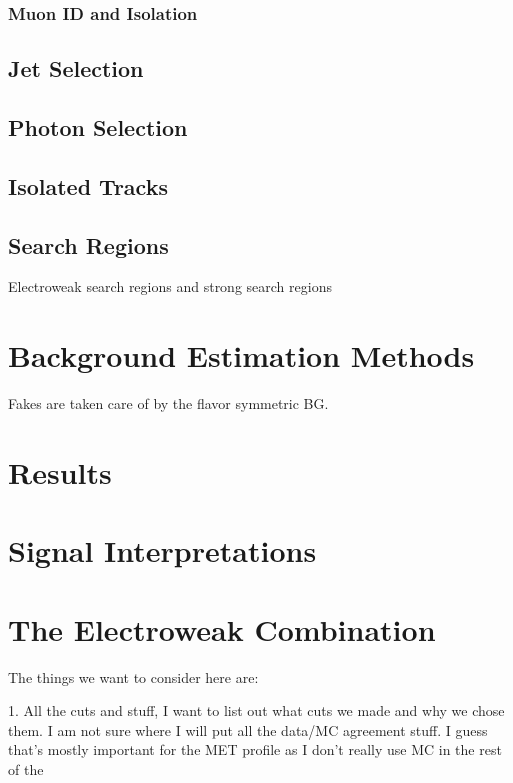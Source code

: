     \subsubsection{Muon ID and Isolation}

  \subsection{Jet Selection}

  \subsection{Photon Selection}

  \subsection{Isolated Tracks}

  \subsection{Search Regions}
    Electroweak search regions and strong search regions

\section{Background Estimation Methods}
Fakes are taken care of by the flavor symmetric BG.

\section{Results}

\section{Signal Interpretations} 

\section{The Electroweak Combination}

The things we want to consider here are: 

  1. All the cuts and stuff, I want to list out what cuts we made and why we chose them. I am not sure where I will put all the data/MC agreement stuff. I guess that's mostly important for the MET profile as I don't really use MC in the rest of the
